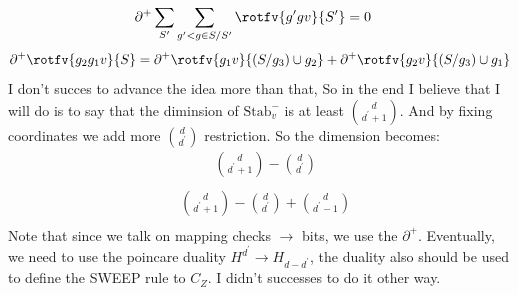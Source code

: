 {\begin{equation*}
\begin{split}
      \partial^{+} \sum_{S^{\prime}}\sum_{g^{\prime} < g \in S/S^{\prime}}\rotfv{g^{\prime}gv}{S^{\prime}} &= 0
    \end{split}
  \end{equation*}
  \begin{equation*}
    \begin{split}
      \partial^{+} \rotfv{g_{2}g_{1}v}{S} = \partial^{+} \rotfv{g_{1}v}{(S/ g_{3}) \cup g_{2} } +  \partial^{+} \rotfv{g_{2}v}{(S / g_{3}) \cup g_{1}} 
    \end{split}
  \end{equation*}
  I don't succes to advance the idea more than that, So in the end I believe that I will do is to say that the diminsion of $\text{Stab}_{v}^{-}$ is at least ${ d \choose d^{\prime}+ 1 } $. And by fixing coordinates we add more ${ d \choose d^{\prime} } $ restriction. So the dimension becomes: 
  \begin{equation*}
    \begin{split}
     & { d \choose d^{\prime}+1 } - { d \choose d^{\prime} } \\
    \end{split}
  \end{equation*}
  \begin{equation*}
    \begin{split}
      & { d \choose d^{\prime}+1 } - { d \choose d^{\prime} } + { d \choose d^{\prime} - 1   } \\
    \end{split}
  \end{equation*}
  Note that since we talk on mapping checks $\rightarrow$ bits, we use the $\partial^{+}$. Eventually, we need to use the poincare duality $H^{d^{\prime}} \rightarrow H_{d - d^{\prime}}$, the duality also should be used to define the SWEEP rule to $C_{Z}$. I didn't successes to do it other way. 
}

